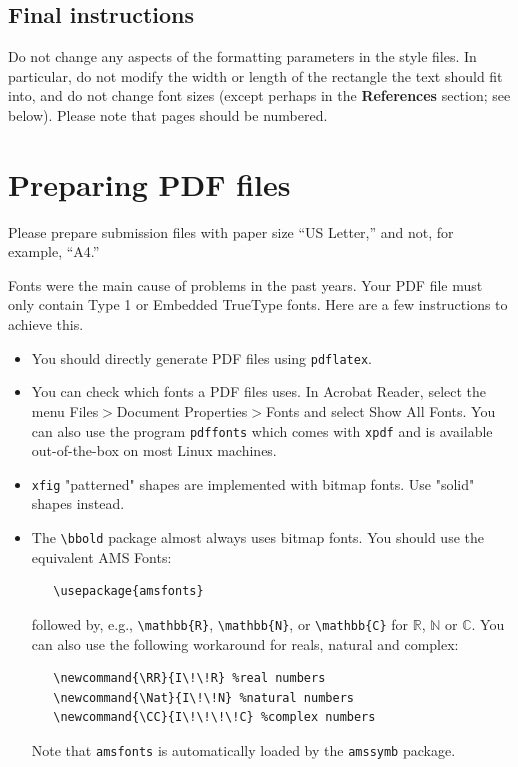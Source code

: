 \documentclass{article}
\begin{document}
\subsection{Final instructions}

Do not change any aspects of the formatting parameters in the style files.  In
particular, do not modify the width or length of the rectangle the text should
fit into, and do not change font sizes (except perhaps in the
\textbf{References} section; see below). Please note that pages should be
numbered.


\section{Preparing PDF files}


Please prepare submission files with paper size ``US Letter,'' and not, for
example, ``A4.''


Fonts were the main cause of problems in the past years. Your PDF file must only
contain Type 1 or Embedded TrueType fonts. Here are a few instructions to
achieve this.


\begin{itemize}


\item You should directly generate PDF files using \verb+pdflatex+.


\item You can check which fonts a PDF files uses.  In Acrobat Reader, select the
  menu Files$>$Document Properties$>$Fonts and select Show All Fonts. You can
  also use the program \verb+pdffonts+ which comes with \verb+xpdf+ and is
  available out-of-the-box on most Linux machines.


\item \verb+xfig+ "patterned" shapes are implemented with bitmap fonts.  Use
  "solid" shapes instead.


\item The \verb+\bbold+ package almost always uses bitmap fonts.  You should use
  the equivalent AMS Fonts:
\begin{verbatim}
   \usepackage{amsfonts}
\end{verbatim}
followed by, e.g., \verb+\mathbb{R}+, \verb+\mathbb{N}+, or \verb+\mathbb{C}+
for $\mathbb{R}$, $\mathbb{N}$ or $\mathbb{C}$.  You can also use the following
workaround for reals, natural and complex:
\begin{verbatim}
   \newcommand{\RR}{I\!\!R} %real numbers
   \newcommand{\Nat}{I\!\!N} %natural numbers
   \newcommand{\CC}{I\!\!\!\!C} %complex numbers
\end{verbatim}
Note that \verb+amsfonts+ is automatically loaded by the \verb+amssymb+ package.


\end{itemize}
\end{document}
